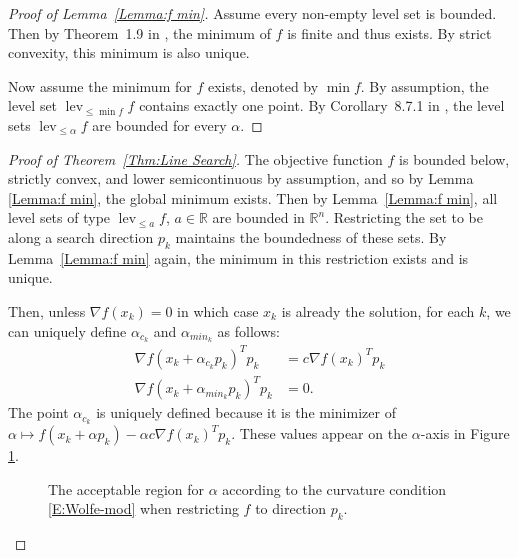 \documentclass[oneside]{myumnStatThesis}
\DeclareMathOperator{\lev}{lev}
\def\RR{{\mathbb R}}
\begin{document}

\begin{proof}[Proof of Lemma~\ref{Lemma:f min}]
Assume every non-empty level set is bounded.  Then by Theorem~1.9 in \citet{Rockafellar}, the minimum of $f$ is finite 
and thus exists.  By strict convexity, this minimum is also unique.

Now assume the minimum for $f$ exists, denoted by $\min f$.  By assumption, the level set $\lev_{\leq \min f} f$ 
contains exactly one point.  By Corollary~8.7.1 in \citet{Rockafellar:1970}, the level sets $\lev_{\leq \alpha} f$ are 
bounded for every $\alpha$.  
\end{proof}

\begin{proof}[Proof of Theorem~\ref{Thm:Line Search}]
The objective function $f$ is bounded below, strictly convex, and lower semicontinuous by assumption, and so by Lemma~
\ref{Lemma:f min}, the global minimum exists.  Then by Lemma~\ref{Lemma:f min}, all level sets of type $\lev_{\leq a} f
$, $a \in \RR$ are bounded in $\RR^n$.  Restricting the set to be along a search direction $p_k$ maintains the 
boundedness of these sets.  By Lemma~\ref{Lemma:f min} again, the minimum in this restriction exists and is unique.     

Then, unless $\nabla f( x_k ) = 0$ in which case $x_k$ is already the solution, for each $k$, we can uniquely define $
\alpha_{c_k}$ and $\alpha_{min_k}$ as follows: 
\begin{align}
	\nabla f( x_k + \alpha_{c_k} p_k)^T p_k &= c \nabla f(x_k)^T p_k \label{E:alphac} \\
	\nabla f( x_k + \alpha_{min_k} p_k)^T p_k &= 0. \label{E:alphamin} 
\end{align}
The point $\alpha_{c_k}$ is uniquely defined because it is the minimizer of $\alpha \mapsto f( x_k + \alpha p_k) - 
\alpha c \nabla f( x_k )^T p_k$.
These values appear on the $\alpha$-axis in Figure \ref{F:Wolfe-mod}.
\begin{figure}
\centering
\scalebox{.4}{}
\caption{The acceptable region for $\alpha$ according to the curvature condition \eqref{E:Wolfe-mod} when restricting 
$f$ to direction $p_k$.}
\label{F:Wolfe-mod}
\end{figure}


\end{proof}
\end{document}
